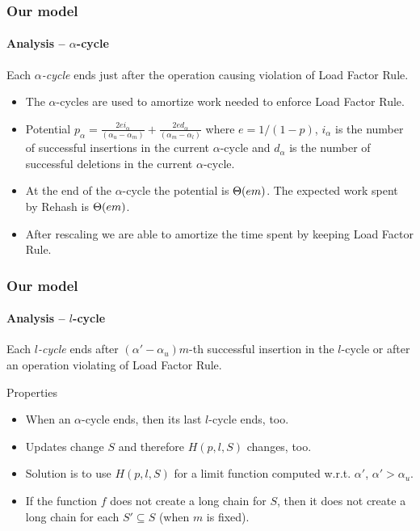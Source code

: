 \begin{frame}
	\frametitle{Our model}
	\framesubtitle{Analysis -- $\alpha$-cycle}
	
	\begin{definition}
		Each \emph{$\alpha$-cycle} ends just after the operation causing violation of Load Factor Rule.
	\end{definition}
	
	\begin{itemize}
		\item The $\alpha$-cycles are used to amortize work needed to enforce Load Factor Rule.
		\item Potential $p_\alpha = \frac{2ei_{\alpha}}{(\alpha_u - \alpha_m)} + \frac{2ed_{\alpha}}{(\alpha_m - \alpha_l)}$ where $e = 1/(1 - p)$, $i_\alpha$ is the number of successful insertions in the current $\alpha$-cycle and $d_\alpha$ is the number of successful deletions in the current $\alpha$-cycle.
		\item At the end of the $\alpha$-cycle the potential is $\mathrm{\Theta}(em)$. The expected work spent by Rehash is $\mathrm{\Theta}(em)$.
		\item After rescaling we are able to amortize the time spent by keeping Load Factor Rule.
	\end{itemize}
\end{frame}

\begin{frame}
	\frametitle{Our model}
	\framesubtitle{Analysis -- $l$-cycle}
	
	\begin{definition}[$l$-cycle]
	Each \emph{$l$-cycle} ends after $(\alpha'-\alpha_u)m$-th successful insertion in the $l$-cycle or after an operation violating of Load Factor Rule.
	\end{definition}
	
	\begin{block}{Properties}
		\begin{itemize}
			\item When an $\alpha$-cycle ends, then its last $l$-cycle ends, too.
			\item Updates change $S$ and therefore $H(p, l, S)$ changes, too.
			\item Solution is to use $H(p, l, S)$ for a limit function computed w.r.t. $\alpha'$, $\alpha' > \alpha_u$.
			\item If the function $f$ does not create a long chain for $S$, then it does not create a long chain for each $S' \subseteq S$ (when $m$ is fixed).
		\end{itemize}
	\end{block}
\end{frame}

